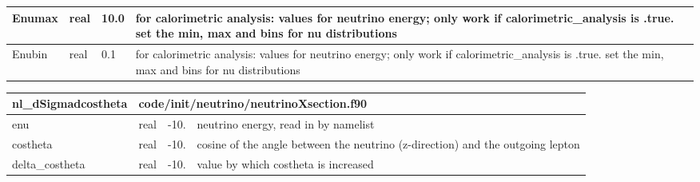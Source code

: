 \documentclass{article}
\begin{document}
\begin{longtable}{llll}
\midrule
Enumax & \begin{minipage}[t]{2cm}real\end{minipage} & \begin{minipage}[t]{2cm}10.0\end{minipage} & \begin{minipage}[t]{12cm}for calorimetric analysis: values for neutrino energy; only work if calorimetric\_analysis is .true. set the min, max and bins for nu distributions\end{minipage}\\*
\midrule
Enubin & \begin{minipage}[t]{2cm}real\end{minipage} & \begin{minipage}[t]{2cm}0.1\end{minipage} & \begin{minipage}[t]{12cm}for calorimetric analysis: values for neutrino energy; only work if calorimetric\_analysis is .true. set the min, max and bins for nu distributions\end{minipage}\\*
\bottomrule
\end{longtable}
{ }




\begin{longtable}{llll}
\toprule
\textbf{\large{nl\_dSigmadcostheta}} & \multicolumn{3}{l}{\footnotesize{code/init/neutrino/neutrinoXsection.f90}}\\*
\midrule
\endfirsthead
\midrule
\endhead
enu & \begin{minipage}[t]{2cm}real\end{minipage} & \begin{minipage}[t]{2cm}-10.\end{minipage} & \begin{minipage}[t]{12cm}neutrino energy, read in by namelist\end{minipage}\\*
\midrule
costheta & \begin{minipage}[t]{2cm}real\end{minipage} & \begin{minipage}[t]{2cm}-10.\end{minipage} & \begin{minipage}[t]{12cm}cosine of the angle between the neutrino (z-direction) and the outgoing lepton\end{minipage}\\*
\midrule
delta\_costheta & \begin{minipage}[t]{2cm}real\end{minipage} & \begin{minipage}[t]{2cm}-10.\end{minipage} & \begin{minipage}[t]{12cm}value by which costheta is increased\end{minipage}\\*
\bottomrule
\end{longtable}
{ }
\end{document}
